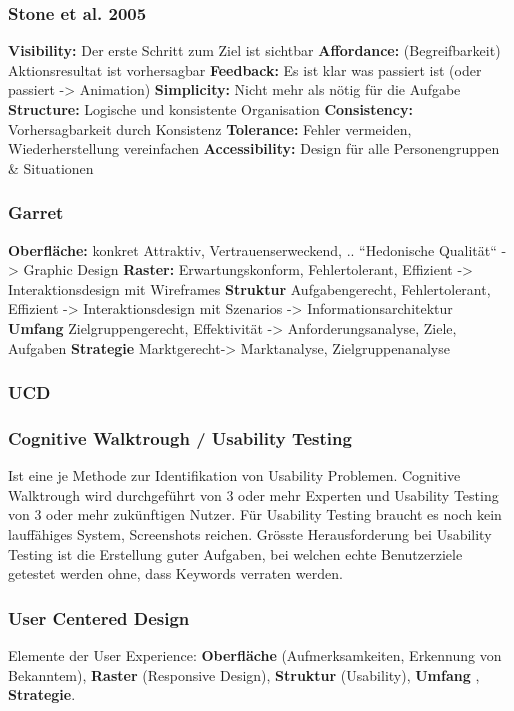 \begin{multicols*}{4}
\subsubsection{Stone et al. 2005}
\textbf{Visibility:} Der erste Schritt zum Ziel ist sichtbar
\textbf{Affordance:} (Begreifbarkeit) Aktionsresultat ist vorhersagbar
\textbf{Feedback:} Es ist klar was passiert ist (oder passiert -> Animation)
\textbf{Simplicity:} Nicht mehr als nötig für die Aufgabe
\textbf{Structure:} Logische und konsistente Organisation
\textbf{Consistency:} Vorhersagbarkeit durch Konsistenz
\textbf{Tolerance:} Fehler vermeiden, Wiederherstellung vereinfachen
\textbf{Accessibility:} Design für alle Personengruppen \& Situationen
\subsubsection{Garret}
\textbf{Oberfläche:} konkret Attraktiv, Vertrauenserweckend, .. “Hedonische Qualität“
-> Graphic Design
\textbf{Raster:} Erwartungskonform, Fehlertolerant, Effizient -> Interaktionsdesign mit Wireframes
\textbf{Struktur} Aufgabengerecht, Fehlertolerant, Effizient
-> Interaktionsdesign mit Szenarios -> Informationsarchitektur
\textbf{Umfang} Zielgruppengerecht, Effektivität -> Anforderungsanalyse, Ziele, Aufgaben
\textbf{Strategie}  Marktgerecht-> Marktanalyse, Zielgruppenanalyse
\subsubsection{UCD}
\subsubsection{Cognitive Walktrough / Usability Testing}
\tiny Ist eine je Methode zur Identifikation von Usability Problemen. Cognitive 
Walktrough wird durchgeführt von 3 oder mehr Experten und Usability Testing 
von 3 oder mehr zukünftigen Nutzer. Für Usability Testing braucht es noch kein 
lauffähiges System, Screenshots reichen. Grösste Herausforderung bei Usability 
Testing ist die Erstellung guter Aufgaben, bei welchen echte Benutzerziele getestet 
werden ohne, dass Keywords verraten werden.
\subsubsection{User Centered Design}
Elemente der User Experience: \textbf{Oberfläche} (Aufmerksamkeiten, 
Erkennung von Bekanntem), \textbf{Raster} (Responsive Design), \textbf{Struktur} (Usability), 
\textbf{Umfang} , \textbf{Strategie}.


\end{multicols*}
